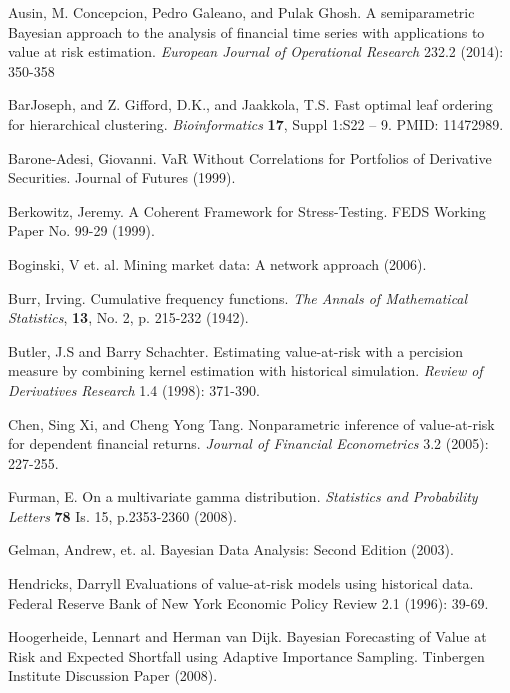\documentclass{amsart}
\begin{document}
\begin{thebibliography}{100}
 Ausin, M. Concepcion, Pedro Galeano, and Pulak Ghosh. A semiparametric 
    Bayesian approach to the analysis of financial time series with applications to value 
    at risk estimation. \emph{European Journal of Operational Research} 232.2 (2014): 350-358

 BarJoseph, and Z. Gifford, D.K., and Jaakkola, T.S. Fast optimal 
    leaf ordering for hierarchical clustering.  \emph{Bioinformatics} \textbf{17}, Suppl 
    1:S22 -- 9. PMID: 11472989.

 Barone-Adesi, Giovanni. VaR Without Correlations for Portfolios 
    of Derivative Securities. Journal of Futures (1999).

 Berkowitz, Jeremy. A Coherent Framework for Stress-Testing. 
    FEDS Working Paper No. 99-29 (1999). 

 Boginski, V et. al.  Mining market data: A network approach (2006).

 Burr, Irving. Cumulative frequency functions. \emph{The Annals of
    Mathematical Statistics}, \textbf{13}, No. 2, p. 215-232 (1942).

 Butler, J.S and Barry Schachter.  Estimating value-at-risk with a 
    percision measure by combining kernel estimation with historical simulation.  \emph{Review 
    of Derivatives Research} 1.4 (1998): 371-390.

 Chen, Sing Xi, and Cheng Yong Tang. Nonparametric inference of value-at-risk 
    for dependent financial returns. \emph{Journal of Financial Econometrics} 3.2 (2005): 227-255.

 Furman, E.  On a multivariate gamma distribution. \emph{Statistics and 
    Probability Letters} \textbf{78} Is. 15, p.2353-2360 (2008).

 Gelman, Andrew, et. al. Bayesian Data Analysis: Second Edition (2003).
    
Hendricks, Darryll Evaluations of value-at-risk models using historical data. 
    Federal Reserve Bank of New York Economic Policy Review 2.1 (1996): 39-69.

 Hoogerheide, Lennart and Herman van Dijk.  Bayesian Forecasting 
    of Value at Risk and Expected Shortfall using Adaptive Importance Sampling.  Tinbergen 
    Institute Discussion Paper (2008). 


\end{thebibliography}
\end{document}
